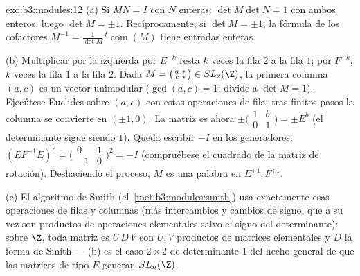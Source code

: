 \begin{solution}{exo:b3:modules:12}
(a) Si $MN = I$ con $N$ enteras: $\det M\det N = 1$ con ambos enteros,
luego $\det M = \pm1$. Recíprocamente, si $\det M =
\pm1$, la fórmula de los cofactores $M^{-1} =
\frac1{\det M}\,{}^t\!\operatorname{com}(M)$ tiene entradas enteras.

(b) Multiplicar por la izquierda por $E^{-k}$ resta $k$ veces la fila
$2$ a la fila $1$; por $F^{-k}$, $k$ veces la fila $1$ a la fila $2$.
Dada $M = \bigl(\begin{smallmatrix}a & *\\ c &
*\end{smallmatrix}\bigr) \in SL_2(\Z)$, la primera columna $(a, c)$ es
un vector unimodular ($\gcd(a, c) = 1$: divide a $\det M = 1$).
Ejecútese Euclides sobre $(a, c)$ con estas operaciones de fila: tras
finitos pasos la columna se convierte en $(\pm1, 0)$. La matriz es ahora
$\pm
\bigl(\begin{smallmatrix}1 & b\\ 0 & 1\end{smallmatrix}
\bigr) = \pm E^{b}$ (el determinante sigue siendo $1$). Queda escribir
$-I$ en los generadores: $(EF^{-1}E)^2 =
\bigl(\begin{smallmatrix}0 & 1\\ -1 &
0\end{smallmatrix}\bigr)^2 = -I$ (compruébese el cuadrado de la matriz
de rotación). Deshaciendo el proceso, $M$ es una palabra en $E^{\pm1},
F^{\pm1}$.

(c) El algoritmo de Smith (el~\cref{met:b3:modules:smith}) usa
exactamente esas operaciones de filas y columnas (más intercambios y
cambios de signo, que a su vez son productos de operaciones elementales
salvo el signo del determinante): sobre $\Z$, toda matriz es $U\,D\,V$
con $U, V$ productos de matrices elementales y $D$ la forma de Smith ---
(b) es el caso $2\times2$ de determinante $1$ del hecho general de que
las matrices de tipo $E$ generan
$SL_n(\Z)$.
\end{solution}

